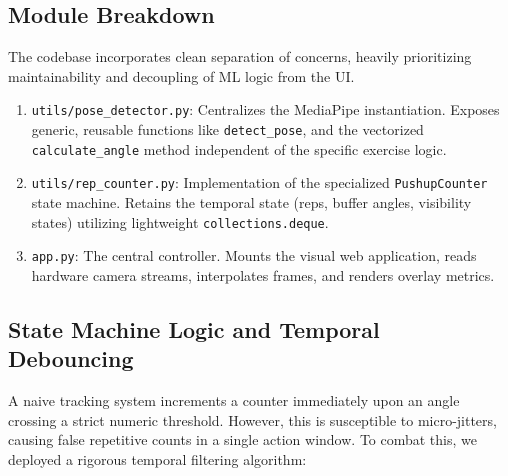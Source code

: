 \documentclass[12pt, a4paper]{article}
\begin{document}
\subsection{Module Breakdown}
The codebase incorporates clean separation of concerns, heavily prioritizing maintainability and decoupling of ML logic from the UI.
\begin{enumerate}
    \item \texttt{utils/pose\_detector.py}: Centralizes the MediaPipe instantiation. Exposes generic, reusable functions like \texttt{detect\_pose}, and the vectorized \texttt{calculate\_angle} method independent of the specific exercise logic.
    \item \texttt{utils/rep\_counter.py}: Implementation of the specialized \texttt{PushupCounter} state machine. Retains the temporal state (reps, buffer angles, visibility states) utilizing lightweight \texttt{collections.deque}.
    \item \texttt{app.py}: The central controller. Mounts the visual web application, reads hardware camera streams, interpolates frames, and renders overlay metrics.
\end{enumerate}

\subsection{State Machine Logic and Temporal Debouncing}
A naive tracking system increments a counter immediately upon an angle crossing a strict numeric threshold. However, this is susceptible to micro-jitters, causing false repetitive counts in a single action window. To combat this, we deployed a rigorous temporal filtering algorithm:
\end{document}
